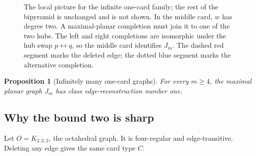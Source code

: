 \documentclass[11pt]{article}
\newtheorem{proposition}[theorem]{Proposition}
\theoremstyle{definition}
\theoremstyle{remark}
\begin{document}
\begin{figure}[htbp]
\caption{The local picture for the infinite one-card family; the rest of the
bipyramid is unchanged and is not shown.  In the middle card, \(w\) has
degree two.  A maximal-planar completion must join it to one of the two hubs.
The left and right completions are isomorphic under the hub swap
\(p\leftrightarrow q\), so the middle card identifies \(J_m\).  The dashed
red segment marks the deleted edge; the dotted blue segment marks the
alternative completion.}
\label{fig:infinite-family}
\end{figure}

\begin{proposition}[Infinitely many one-card graphs]\label{prop:infinite-one-card}
For every \(m\ge4\), the maximal planar graph \(J_m\) has class
edge-reconstruction number one.
\end{proposition}

\FloatBarrier
\subsection{Why the bound two is sharp}

Let \(O=K_{2,2,2}\), the octahedral graph.  It is four-regular and
edge-transitive.  Deleting any edge gives the same card type \(C\).
\end{document}
